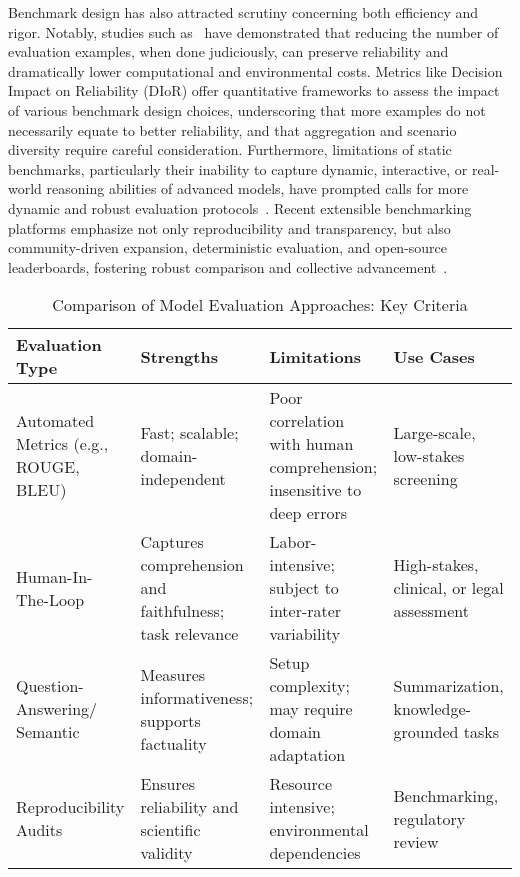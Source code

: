 \documentclass[sigconf]{acmart}
\begin{document}
Benchmark design has also attracted scrutiny concerning both efficiency and rigor. Notably, studies such as~\cite{ref104} have demonstrated that reducing the number of evaluation examples, when done judiciously, can preserve reliability and dramatically lower computational and environmental costs. Metrics like Decision Impact on Reliability (DIoR) offer quantitative frameworks to assess the impact of various benchmark design choices, underscoring that more examples do not necessarily equate to better reliability, and that aggregation and scenario diversity require careful consideration. Furthermore, limitations of static benchmarks, particularly their inability to capture dynamic, interactive, or real-world reasoning abilities of advanced models, have prompted calls for more dynamic and robust evaluation protocols~\cite{ref76, ref91, ref94, ref101, ref104}. Recent extensible benchmarking platforms emphasize not only reproducibility and transparency, but also community-driven expansion, deterministic evaluation, and open-source leaderboards, fostering robust comparison and collective advancement~\cite{ref101}.

\begin{table*}[htbp]
\centering
\caption{Comparison of Model Evaluation Approaches: Key Criteria}
\label{tab:evaluation_criteria}
\begin{adjustbox}{max width=\textwidth}
\begin{tabular}{@{}llll@{}}
\toprule
\textbf{Evaluation Type} & \textbf{Strengths} & \textbf{Limitations} & \textbf{Use Cases} \\
\midrule
Automated Metrics (e.g., ROUGE, BLEU) & Fast; scalable; domain-independent & Poor correlation with human comprehension; insensitive to deep errors & Large-scale, low-stakes screening \\
Human-In-The-Loop & Captures comprehension and faithfulness; task relevance & Labor-intensive; subject to inter-rater variability & High-stakes, clinical, or legal assessment \\
Question-Answering/ Semantic & Measures informativeness; supports factuality & Setup complexity; may require domain adaptation & Summarization, knowledge-grounded tasks \\
Reproducibility Audits & Ensures reliability and scientific validity & Resource intensive; environmental dependencies & Benchmarking, regulatory review \\
\bottomrule
\end{tabular}
\end{adjustbox}
\end{table*}
\end{document}
